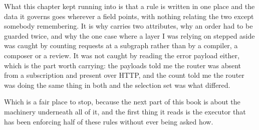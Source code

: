 \medskip
What this chapter kept running into is that a rule is written in one place and
the data it governs goes wherever a field points, with nothing relating the two
except somebody remembering. It is why  carries two
attributes, why an order had to be guarded twice, and why the one case where a
layer I was relying on stepped aside was caught by counting requests at a
subgraph rather than by a compiler, a composer or a review. It was not caught by
reading the error payload either, which is the part worth carrying: the payloads
told me the router was absent from a subscription and present over HTTP, and the
count told me the router was doing the same thing in both and the selection set
was what differed.

Which is a fair place to stop, because the next part of this book is about the
machinery underneath all of it, and the first thing it reads is the executor
that has been enforcing half of these rules without ever being asked how.

%
